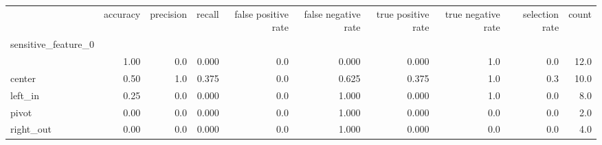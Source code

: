 \begin{tabular}{lrrrrrrrrr}
\toprule
{} &  accuracy &  precision &  recall &  false positive rate &  false negative rate &  true positive rate &  true negative rate &  selection rate &  count \\
sensitive\_feature\_0 &           &            &         &                      &                      &                     &                     &                 &        \\
\midrule
                    &      1.00 &        0.0 &   0.000 &                  0.0 &                0.000 &               0.000 &                 1.0 &             0.0 &   12.0 \\
center              &      0.50 &        1.0 &   0.375 &                  0.0 &                0.625 &               0.375 &                 1.0 &             0.3 &   10.0 \\
left\_in             &      0.25 &        0.0 &   0.000 &                  0.0 &                1.000 &               0.000 &                 1.0 &             0.0 &    8.0 \\
pivot               &      0.00 &        0.0 &   0.000 &                  0.0 &                1.000 &               0.000 &                 0.0 &             0.0 &    2.0 \\
right\_out           &      0.00 &        0.0 &   0.000 &                  0.0 &                1.000 &               0.000 &                 0.0 &             0.0 &    4.0 \\
\bottomrule
\end{tabular}
